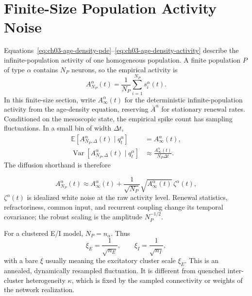 \section{Finite-Size Population Activity Noise}
\label{sec:finite-size-population-noise}

Equations~\eqref{eq:ch03-age-density-pde}--\eqref{eq:ch03-age-density-activity}
describe the infinite-population activity of one homogeneous population. A
finite population \(P\) of type \(\alpha\) contains \(N_P\) neurons, so the
empirical activity is
%
\begin{equation}
  A_{N_P}^\alpha(t)
  =
  \frac{1}{N_P}
  \sum_{i=1}^{N_P}s_i^\alpha(t).
  \label{eq:ch03-finite-empirical-activity}
\end{equation}
%
In this finite-size section, write \(A_\infty^\alpha(t)\) for the deterministic
infinite-population activity from the age-density equation, reserving
\(\bar A^\alpha\) for stationary renewal rates. Conditioned on the mesoscopic
state, the empirical spike count has sampling fluctuations. In a small bin of
width \(\Delta t\),
%
\begin{align}
  \mathbb E\!\left[
    A_{N_P,\Delta}^\alpha(t)
    \mid q^\alpha_t
  \right]
  &=
  A_\infty^\alpha(t),
  \label{eq:ch03-finite-bin-mean}
  \\
  \operatorname{Var}\!\left[
    A_{N_P,\Delta}^\alpha(t)
    \mid q^\alpha_t
  \right]
  &\approx
  \frac{A_\infty^\alpha(t)}{N_P\Delta t}.
  \label{eq:ch03-finite-bin-var}
\end{align}
%
The diffusion shorthand is therefore
%
\begin{keyequation}
\begin{equation}
  A_{N_P}^\alpha(t)
  \approx
  A_\infty^\alpha(t)
  +
  \frac{1}{\sqrt{N_P}}
  \sqrt{A_\infty^\alpha(t)}\,\zeta^\alpha(t),
  \label{eq:ch03-activity-diffusion}
\end{equation}
\tcblower
\(\zeta^\alpha(t)\) is idealized white noise at the raw activity level. Renewal
statistics, refractoriness, common input, and recurrent coupling change its
temporal covariance; the robust scaling is the amplitude \(N_P^{-1/2}\).
\end{keyequation}

For a clustered E/I model, \(N_P=n_\alpha\). Thus
\[
  \xi_E=\frac{1}{\sqrt{n_E}},
  \qquad
  \xi_I=\frac{1}{\sqrt{n_I}},
\]
with a bare \(\xi\) usually meaning the excitatory cluster scale
\(\xi_E\). This is an annealed, dynamically resampled fluctuation. It is
different from quenched inter-cluster heterogeneity \(\kappa\), which is fixed
by the sampled connectivity or weights of the network realization.

